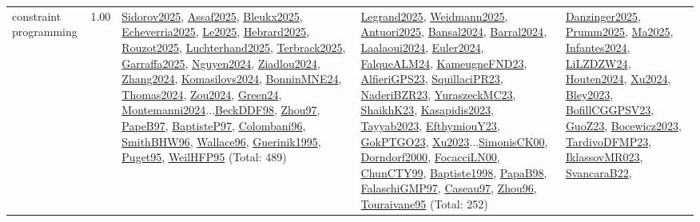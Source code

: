{\begin{longtable}{p{3cm}r>{\raggedright\arraybackslash}p{6cm}>{\raggedright\arraybackslash}p{6cm}>{\raggedright\arraybackslash}p{8cm}}
\index{constraint programming}\index{CP!constraint programming}constraint programming &  1.00 & \hyperref[detail:Sidorov2025]{Sidorov2025}, \hyperref[detail:Assaf2025]{Assaf2025}, \hyperref[detail:Bleukx2025]{Bleukx2025}, \hyperref[detail:Echeverria2025]{Echeverria2025}, \hyperref[detail:Le2025]{Le2025}, \hyperref[detail:Hebrard2025]{Hebrard2025}, \hyperref[detail:Rouzot2025]{Rouzot2025}, \hyperref[detail:Luchterhand2025]{Luchterhand2025}, \hyperref[detail:Terbrack2025]{Terbrack2025}, \hyperref[detail:Garraffa2025]{Garraffa2025}, \hyperref[detail:Nguyen2024]{Nguyen2024}, \hyperref[detail:Ziadlou2024]{Ziadlou2024}, \hyperref[detail:Zhang2024]{Zhang2024}, \hyperref[detail:Komasilovs2024]{Komasilovs2024}, \hyperref[detail:BonninMNE24]{BonninMNE24}, \hyperref[detail:Thomas2024]{Thomas2024}, \hyperref[detail:Zou2024]{Zou2024}, \hyperref[detail:Green24]{Green24}, \hyperref[detail:Montemanni2024]{Montemanni2024}...\hyperref[detail:BeckDDF98]{BeckDDF98}, \hyperref[detail:Zhou97]{Zhou97}, \hyperref[detail:PapeB97]{PapeB97}, \hyperref[detail:BaptisteP97]{BaptisteP97}, \hyperref[detail:Colombani96]{Colombani96}, \hyperref[detail:SmithBHW96]{SmithBHW96}, \hyperref[detail:Wallace96]{Wallace96}, \hyperref[detail:Guerinik1995]{Guerinik1995}, \hyperref[detail:Puget95]{Puget95}, \hyperref[detail:WeilHFP95]{WeilHFP95} (Total: 489) & \hyperref[detail:Legrand2025]{Legrand2025}, \hyperref[detail:Weidmann2025]{Weidmann2025}, \hyperref[detail:Antuori2025]{Antuori2025}, \hyperref[detail:Bansal2024]{Bansal2024}, \hyperref[detail:Barral2024]{Barral2024}, \hyperref[detail:Laalaoui2024]{Laalaoui2024}, \hyperref[detail:Euler2024]{Euler2024}, \hyperref[detail:FalqueALM24]{FalqueALM24}, \hyperref[detail:KameugneFND23]{KameugneFND23}, \hyperref[detail:AlfieriGPS23]{AlfieriGPS23}, \hyperref[detail:SquillaciPR23]{SquillaciPR23}, \hyperref[detail:NaderiBZR23]{NaderiBZR23}, \hyperref[detail:YuraszeckMC23]{YuraszeckMC23}, \hyperref[detail:ShaikhK23]{ShaikhK23}, \hyperref[detail:Kasapidis2023]{Kasapidis2023}, \hyperref[detail:Tayyab2023]{Tayyab2023}, \hyperref[detail:EfthymiouY23]{EfthymiouY23}, \hyperref[detail:GokPTGO23]{GokPTGO23}, \hyperref[detail:Xu2023]{Xu2023}...\hyperref[detail:SimonisCK00]{SimonisCK00}, \hyperref[detail:Dorndorf2000]{Dorndorf2000}, \hyperref[detail:FocacciLN00]{FocacciLN00}, \hyperref[detail:ChunCTY99]{ChunCTY99}, \hyperref[detail:Baptiste1998]{Baptiste1998}, \hyperref[detail:PapaB98]{PapaB98}, \hyperref[detail:FalaschiGMP97]{FalaschiGMP97}, \hyperref[detail:Caseau97]{Caseau97}, \hyperref[detail:Zhou96]{Zhou96}, \hyperref[detail:Touraivane95]{Touraivane95} (Total: 252) & \hyperref[detail:Danzinger2025]{Danzinger2025}, \hyperref[detail:Prumm2025]{Prumm2025}, \hyperref[detail:Ma2025]{Ma2025}, \hyperref[detail:Infantes2024]{Infantes2024}, \hyperref[detail:LiLZDZW24]{LiLZDZW24}, \hyperref[detail:Houten2024]{Houten2024}, \hyperref[detail:Xu2024]{Xu2024}, \hyperref[detail:Bley2023]{Bley2023}, \hyperref[detail:BofillCGGPSV23]{BofillCGGPSV23}, \hyperref[detail:GuoZ23]{GuoZ23}, \hyperref[detail:Bocewicz2023]{Bocewicz2023}, \hyperref[detail:TardivoDFMP23]{TardivoDFMP23}, \hyperref[detail:IklassovMR023]{IklassovMR023}, \hyperref[detail:SvancaraB22]{SvancaraB22}, 
\end{longtable}}
